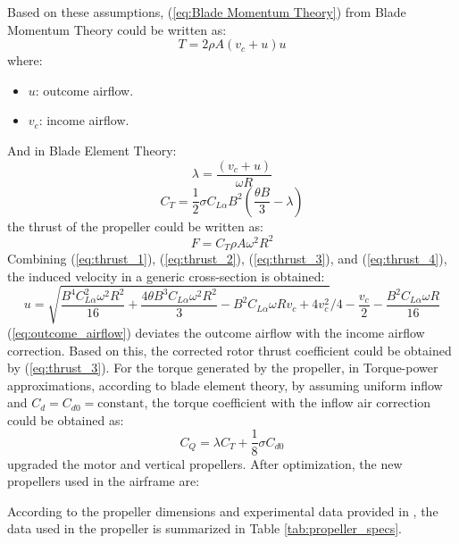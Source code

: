 Based on these assumptions, (\ref{eq:Blade Momentum Theory}) from Blade Momentum Theory could be written as:
\begin{equation}
    T = 2 \rho A (v_c + u) u \label{eq:thrust_1}
\end{equation}
where:
\begin{itemize}
    \item $u$: outcome airflow.
    \item $v_c$: income airflow.
\end{itemize}
And in Blade Element Theory:
\begin{equation}
    \lambda = \frac{{(v_c + u)}}{{\omega R}}    \label{eq:thrust_2}
\end{equation}
\begin{equation}
    C_T = \frac{1}{2} \sigma C_{L\alpha} B^2 \left( \frac{{\theta B}}{3} - \lambda \right)  \label{eq:thrust_3}
\end{equation}
the thrust of the propeller could be written as:
\begin{equation}
    F = C_T \rho A \omega^2 R^2 \label{eq:thrust_4}
\end{equation}
Combining (\ref{eq:thrust_1}), (\ref{eq:thrust_2}), (\ref{eq:thrust_3}), and (\ref{eq:thrust_4}), the induced velocity in a generic cross-section is obtained:
\begin{equation}
    u = \sqrt{\frac{{B^4 C_{L\alpha}^2 \omega^2 R^2}}{{16}} + \frac{{4 \theta B^3 C_{L\alpha} \omega^2 R^2}}{3} - B^2 C_{L\alpha} \omega R v_c + 4 v_c^2} / 4 - \frac{{v_c}}{2} - \frac{{B^2 C_{L\alpha} \omega R}}{16}  \label{eq:outcome_airflow}
\end{equation}
(\ref{eq:outcome_airflow}) deviates the outcome airflow with the income airflow correction. Based on this, the corrected rotor thrust coefficient could be obtained by (\ref{eq:thrust_3}). For the torque generated by the propeller, in Torque-power approximations, according to blade element theory, by assuming uniform inflow and $C_d = C_{d0} = \text{constant}$, the torque coefficient with the inflow air correction could be obtained as:
\begin{equation}
    C_Q = \lambda C_T + \frac{1}{8} \sigma C_{d0}
\end{equation}
\cite{battaini2022} upgraded the motor and vertical propellers. After optimization, the new propellers used in the airframe are:

According to the propeller dimensions and experimental data provided in \cite{battaini2022}, the data used in the propeller is summarized in Table \ref{tab:propeller_specs}.


